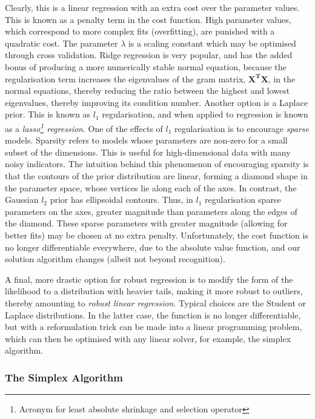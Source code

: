 \documentclass[11pt]{amsart}
\begin{document}
Clearly, this is a linear regression with an extra cost over the parameter values. This is known as a penalty term in the cost function. High parameter values, which correspond to more complex fits (overfitting), are punished with a quadratic cost. The parameter $\lambda$ is a scaling constant which may be optimised through cross validation. Ridge regression is very popular, and has the added bonus of producing a more numerically stable normal equation, because the regularisation term increases the eigenvalues of the gram matrix, $\mathbf{X^T}\mathbf{X}$, in the normal equations, thereby reducing the ratio between the highest and lowest eigenvalues, thereby improving its condition number. Another option is a Laplace prior. This is known as $l_1$ regularisation, and when applied to regression is known as a \emph{lasso\footnote{Acronym for least absolute shrinkage and selection operator} regression}. One of the effects of $l_1$ regularisation is to encourage \emph{sparse} models. Sparsity refers to models whose parameters are non-zero for a small subset of the dimensions. This is useful for high-dimensional data with many noisy indicators. The intuition behind this phenomenon of encouraging sparsity is that the contours of the prior distribution are linear, forming a diamond shape in the parameter space, whose vertices lie along each of the axes. In contrast, the Gaussian $l_2$ prior has ellipsoidal contours. Thus, in $l_1$ regularisation sparse parameters on the axes, greater magnitude than parameters along the edges of the diamond. These sparse parameters with greater magnitude (allowing for better fits) may be chosen at no extra penalty. Unfortunately, the cost function is no longer differentiable everywhere, due to the absolute value function, and our solution algorithm changes (albeit not beyond recognition).

A final, more drastic option for robust regression is to modify the form of the likelihood to a distribution with heavier tails, making it more robust to outliers, thereby amounting to \emph{robust linear regression}. Typical choices are the Student or Laplace distributions. In the latter case, the function is no longer differentiable, but with a reformulation trick can be made into a linear programming problem, which can then be optimised with any linear solver, for example, the simplex algorithm.

\subsubsection{The Simplex Algorithm}
\end{document}
